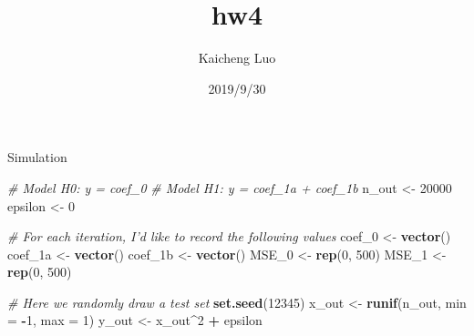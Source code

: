 \documentclass[]{article}
\title{hw4}
\author{Kaicheng Luo}
\date{2019/9/30}
\newenvironment{Shaded}{\begin{snugshade}}{\end{snugshade}}
\newcommand{\KeywordTok}[1]{\textcolor[rgb]{0.13,0.29,0.53}{\textbf{#1}}}
\newcommand{\DataTypeTok}[1]{\textcolor[rgb]{0.13,0.29,0.53}{#1}}
\newcommand{\DecValTok}[1]{\textcolor[rgb]{0.00,0.00,0.81}{#1}}
\newcommand{\StringTok}[1]{\textcolor[rgb]{0.31,0.60,0.02}{#1}}
\newcommand{\CommentTok}[1]{\textcolor[rgb]{0.56,0.35,0.01}{\textit{#1}}}
\newcommand{\OperatorTok}[1]{\textcolor[rgb]{0.81,0.36,0.00}{\textbf{#1}}}
\newcommand{\NormalTok}[1]{#1}
\begin{document}
\maketitle

Simulation

\begin{Shaded}
\begin{Highlighting}[]
\CommentTok{# Model H0: y = coef_0}
\CommentTok{# Model H1: y = coef_1a + coef_1b}
\NormalTok{n_out <-}\StringTok{ }\DecValTok{20000}
\NormalTok{epsilon <-}\StringTok{ }\DecValTok{0}

\CommentTok{# For each iteration, I'd like to record the following values}
\NormalTok{coef_}\DecValTok{0}\NormalTok{ <-}\StringTok{ }\KeywordTok{vector}\NormalTok{()}
\NormalTok{coef_1a <-}\StringTok{ }\KeywordTok{vector}\NormalTok{()}
\NormalTok{coef_1b <-}\StringTok{ }\KeywordTok{vector}\NormalTok{()}
\NormalTok{MSE_}\DecValTok{0}\NormalTok{ <-}\StringTok{ }\KeywordTok{rep}\NormalTok{(}\DecValTok{0}\NormalTok{, }\DecValTok{500}\NormalTok{)}
\NormalTok{MSE_}\DecValTok{1}\NormalTok{ <-}\StringTok{ }\KeywordTok{rep}\NormalTok{(}\DecValTok{0}\NormalTok{, }\DecValTok{500}\NormalTok{)}

\CommentTok{# Here we randomly draw a test set}
\KeywordTok{set.seed}\NormalTok{(}\DecValTok{12345}\NormalTok{)}
\NormalTok{x_out <-}\StringTok{ }\KeywordTok{runif}\NormalTok{(n_out, }\DataTypeTok{min =} \OperatorTok{-}\DecValTok{1}\NormalTok{, }\DataTypeTok{max =} \DecValTok{1}\NormalTok{)}
\NormalTok{y_out <-}\StringTok{ }\NormalTok{x_out}\OperatorTok{^}\DecValTok{2} \OperatorTok{+}\StringTok{ }\NormalTok{epsilon}


\end{Highlighting}
\end{Shaded}
\end{document}
